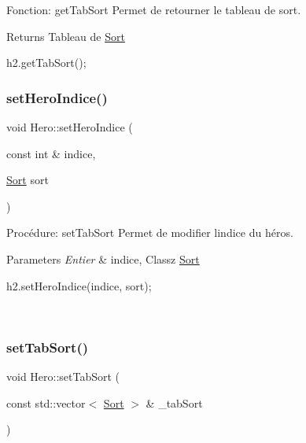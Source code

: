 Fonction\+: get\+Tab\+Sort Permet de retourner le tableau de sort. 

\begin{DoxyReturn}{Returns}
Tableau de \hyperlink{classSort}{Sort} 
\begin{DoxyCode}
h2.getTabSort();
\end{DoxyCode}
 
\end{DoxyReturn}
\mbox{\label{classHero_a48cd72ba539d261504a582a63d7c9e5f}} 
\subsubsection{\texorpdfstring{set\+Hero\+Indice()}{setHeroIndice()}}
{\footnotesize\ttfamily void Hero\+::set\+Hero\+Indice (\begin{DoxyParamCaption}\item[{const int \&}]{indice,  }\item[{\hyperlink{classSort}{Sort}}]{sort }\end{DoxyParamCaption})}



Procédure\+: set\+Tab\+Sort Permet de modifier l\textquotesingle{}indice du héros. 


\begin{DoxyParams}{Parameters}
{\em Entier} & indice, Classz \hyperlink{classSort}{Sort} 
\begin{DoxyCode}
h2.setHeroIndice(indice, sort);
\end{DoxyCode}
 \\
\hline
\end{DoxyParams}
\mbox{\label{classHero_ae7c967e805c745f63534fa342b395954}} 
\subsubsection{\texorpdfstring{set\+Tab\+Sort()}{setTabSort()}}
{\footnotesize\ttfamily void Hero\+::set\+Tab\+Sort (\begin{DoxyParamCaption}\item[{const std\+::vector$<$ \hyperlink{classSort}{Sort} $>$ \&}]{\+\_\+tab\+Sort }\end{DoxyParamCaption})}



